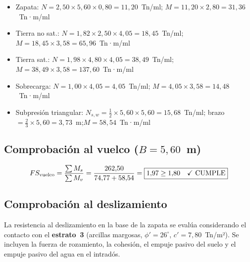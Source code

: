 \begin{notabox}
  \begin{itemize}
    \item Zapata: $N = 2{,}50 \times 5{,}60 \times 0{,}80 = 11{,}20$~Tn/ml;\quad
          $M = 11{,}20 \times 2{,}80 = 31{,}36$~Tn·m/ml
    \item Tierra no sat.: $N = 1{,}82 \times 2{,}50 \times 4{,}05 = 18{,}45$~Tn/ml;\quad
          $M = 18{,}45 \times 3{,}58 = 65{,}96$~Tn·m/ml
    \item Tierra sat.: $N = 1{,}98 \times 4{,}80 \times 4{,}05 = 38{,}49$~Tn/ml;\quad
          $M = 38{,}49 \times 3{,}58 = 137{,}60$~Tn·m/ml
    \item Sobrecarga: $N = 1{,}00 \times 4{,}05 = 4{,}05$~Tn/ml;\quad
          $M = 4{,}05 \times 3{,}58 = 14{,}48$~Tn·m/ml
    \item Subpresión triangular: $N_{s,w} = \tfrac{1}{2} \times 5{,}60 \times 5{,}60 = 15{,}68$~Tn/ml;
          brazo $= \tfrac{2}{3} \times 5{,}60 = 3{,}73$~m;\quad $M = 58{,}54$~Tn·m/ml
  \end{itemize}
\end{notabox}

\subsection{Comprobación al vuelco ($B = 5{,}60$~m)}
\label{subsec:vuelco_5m}

\begin{equation}
  FS_\text{vuelco} = \frac{\sum M_s}{\sum M_v}
    = \frac{262{,}50}{74{,}77+58{,}54} = \boxed{1{,}97 \geq 1{,}80 \quad \checkmark~\text{CUMPLE}}
  \label{eq:fs_vuelco_5m}
\end{equation}

\subsection{Comprobación al deslizamiento}
\label{subsec:deslizamiento}

La resistencia al deslizamiento en la base de la zapata se evalúa considerando
el contacto con el \textbf{estrato~3} (arcillas margosas,
$\phi' = 26^\circ$, $c' = 7{,}80$~Tn/m²). Se incluyen la fuerza de rozamiento,
la cohesión, el empuje pasivo del suelo y el empuje pasivo del agua en el
intradós.

